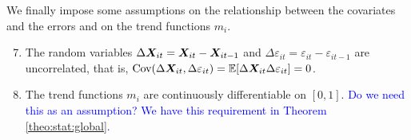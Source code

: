 \documentclass[a4paper,12pt]{article}
\begin{document}
We finally impose some assumptions on the relationship between the covariates and the errors and on the trend functions $m_i$.
\begin{enumerate}[label=(C\arabic*),leftmargin=1.05cm]
\setcounter{enumi}{6}
\item \label{C-reg-err} The random variables $\Delta \boldsymbol{X}_{it} = \boldsymbol{X}_{it} - \boldsymbol{X}_{it-1}$ and $\Delta \varepsilon_{it} = \varepsilon_{it} - \varepsilon_{it-1}$ are uncorrelated, that is, $\textnormal{Cov}(\Delta \boldsymbol{X}_{it}, \Delta \varepsilon_{it}) = \mathbb{E}[\Delta \boldsymbol{X}_{it} \Delta \varepsilon_{it}] = 0$. 
\item \label{C-trend} The trend functions $m_i$ are continuously differentiable on $[0, 1]$. \textcolor{blue}{Do we need this as an assumption? We have this requirement in Theorem \ref{theo:stat:global}.}
\end{enumerate}
\end{document}
